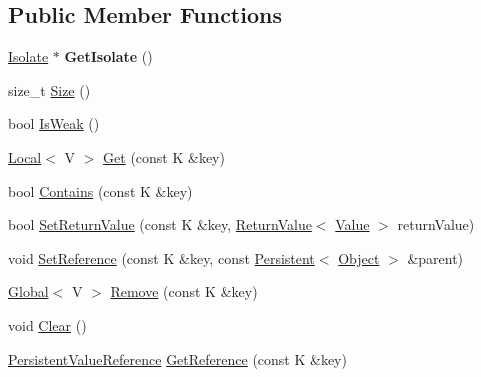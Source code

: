 \subsection*{Public Member Functions}
\begin{DoxyCompactItemize}
\item 
\hypertarget{classv8_1_1_persistent_value_map_base_a80da7adc6e8bdb166912075346116978}{}\hyperlink{classv8_1_1_isolate}{Isolate} $\ast$ {\bfseries Get\+Isolate} ()\label{classv8_1_1_persistent_value_map_base_a80da7adc6e8bdb166912075346116978}

\item 
size\+\_\+t \hyperlink{classv8_1_1_persistent_value_map_base_ade5c5db2a968fdabe073649e85b837eb}{Size} ()
\item 
bool \hyperlink{classv8_1_1_persistent_value_map_base_a9f824b13dd30605589508db2740dd678}{Is\+Weak} ()
\item 
\hyperlink{classv8_1_1_local}{Local}$<$ V $>$ \hyperlink{classv8_1_1_persistent_value_map_base_a16b8f906ea42036c2f37d44813bf2a72}{Get} (const K \&key)
\item 
bool \hyperlink{classv8_1_1_persistent_value_map_base_a8c68e5f99c4042541c6d32232c97282a}{Contains} (const K \&key)
\item 
bool \hyperlink{classv8_1_1_persistent_value_map_base_a85201649d2bbd0ffdebe8be3d5c6447a}{Set\+Return\+Value} (const K \&key, \hyperlink{classv8_1_1_return_value}{Return\+Value}$<$ \hyperlink{classv8_1_1_value}{Value} $>$ return\+Value)
\item 
void \hyperlink{classv8_1_1_persistent_value_map_base_a6fa5f720b283dd9fa626a67e7687dcd0}{Set\+Reference} (const K \&key, const \hyperlink{classv8_1_1_persistent}{Persistent}$<$ \hyperlink{classv8_1_1_object}{Object} $>$ \&parent)
\item 
\hyperlink{classv8_1_1_global}{Global}$<$ V $>$ \hyperlink{classv8_1_1_persistent_value_map_base_abd75a4c050416712167ba0bb9eace097}{Remove} (const K \&key)
\item 
void \hyperlink{classv8_1_1_persistent_value_map_base_a1bf074e7a7c24713c9a3d40ddce89e74}{Clear} ()
\item 
\hyperlink{classv8_1_1_persistent_value_map_base_1_1_persistent_value_reference}{Persistent\+Value\+Reference} \hyperlink{classv8_1_1_persistent_value_map_base_a52e74c69b94c7ce77a65af9f32d68af4}{Get\+Reference} (const K \&key)
\end{DoxyCompactItemize}
